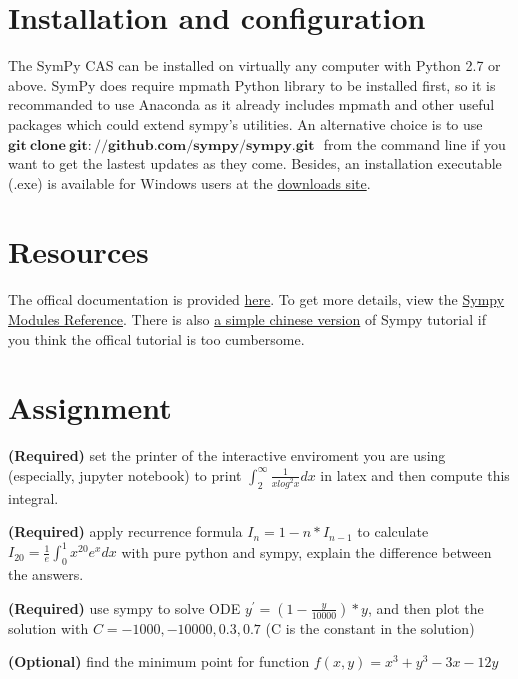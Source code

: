 \documentclass[english]{../TeXTemplate/pkupaper}
\title{\titlemark}
\author{Xiang Meng}
\date{\today}
\begin{document}
\maketitle

\section{Installation and configuration}
The SymPy CAS can be installed on virtually any computer with Python 2.7 or above. SymPy does require mpmath Python library to be installed first, so it is recommanded to use Anaconda as it already includes mpmath and
other useful packages which could extend sympy's utilities. An alternative choice is to use \,\,$\bm{git\ clone\ git://github.com/sympy/sympy.git}$\,\, from the command line if you want to get the lastest updates as they come.
Besides, an installation executable (.exe) is available for Windows users at the \href{https://github.com/sympy/sympy/releases}{downloads site}.

\section{Resources}
The offical documentation is provided \href{http://docs.sympy.org/latest/tutorial/index.html}{here}. To get more
details, view the \href{http://docs.sympy.org/latest/modules/index.html}{Sympy Modules Reference}. There is also
\href{http://ju.outofmemory.cn/entry/80895}{a simple chinese version} of Sympy tutorial if you think the offical tutorial is too cumbersome. 

\section{Assignment}
\begin{partlist}
\item \textbf{(Required)} set the printer of the interactive enviroment you are using (especially, jupyter notebook) to print $\int_{2}^{\infty} \frac{1}{xlog^2x}dx$ in latex and then compute this integral.
\item \textbf{(Required)} apply recurrence formula $I_{n}=1-n*I_{n-1}$ to calculate $I_{20}=\frac{1}{e}\int_{0}^{1}x^{20}e^x dx$ with pure python and sympy, explain the difference between the answers.
\item \textbf{(Required)} use sympy to solve ODE $y^{'} = (1-\frac{y}{10000})*y$, and then plot the solution with $C=-1000, -10000, 0.3, 0.7$ (C is the constant in the solution)
\item \textbf{(Optional)} find the minimum point for function $f(x,y)=x^3+y^3-3x-12y$
\end{partlist}
\end{document}
